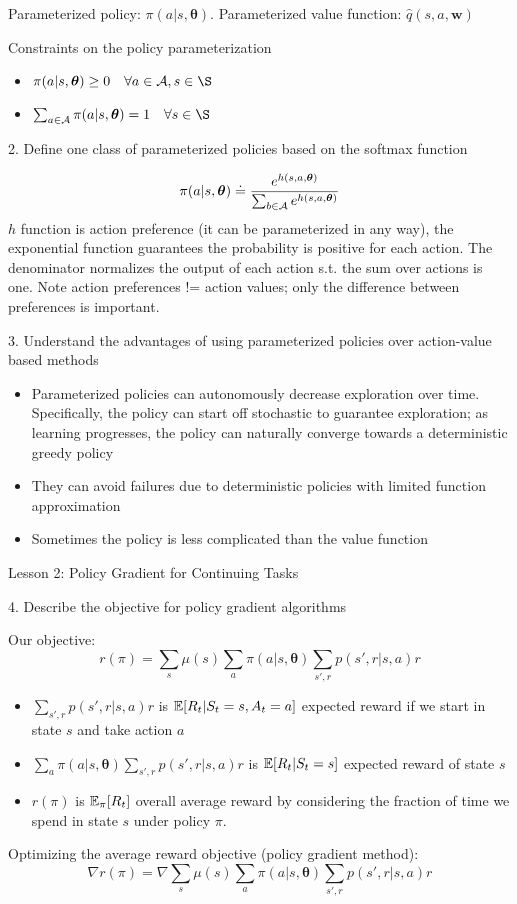 \documentclass[sutton_barto_notes.tex]{subfiles}
\begin{document}
Parameterized policy: $\pi(a|s,\bm{\theta})$. Parameterized value function: $\hat{q}(s,a,\bm{w})$

Constraints on the policy parameterization
\begin{itemize}
\item $\pi(a|s,\bm{\theta}) \geq 0 \quad \forall a \in \A, s \in \S$
\item $\sum_{a\in\A} \pi(a|s,\bm{\theta}) = 1 \quad \forall s \in \S$
\end{itemize}

2. Define one class of parameterized policies based on the softmax function 

$$\pi(a|s,\bm{\theta})\doteq \frac{e^{h(s,a,\bm{\theta})}}{\sum_{b\in\operatorname*{\mathcal{A}}}e^{h(s,a,\bm{\theta})}}$$
$h$ function is action preference (it can be parameterized in any way), the exponential function guarantees the probability is positive for each action. The denominator normalizes the output of each action s.t. the sum over actions is one.
Note action preferences != action values; only the difference between preferences is important.

3. Understand the advantages of using parameterized policies over action-value based methods 

\begin{itemize}
\item Parameterized policies can autonomously decrease exploration over time. Specifically, the policy can start off stochastic to guarantee exploration; as learning progresses, the policy can naturally converge towards a deterministic greedy policy
\item They can avoid failures due to deterministic policies with limited function approximation
\item Sometimes the policy is less complicated than the value function
\end{itemize}

Lesson 2: Policy Gradient for Continuing Tasks 

4. Describe the objective for policy gradient algorithms 

Our objective:
$$r(\pi) = \sum_s \mu(s) \sum_a \pi(a|s,\bm{\theta}) \sum_{s',r} p(s',r|s,a)r $$
\begin{itemize}
\item $\sum_{s',r} p(s',r|s,a)r$ is $\operatorname*{\mathbb{E}}[R_t | S_t=s,A_t=a]$ expected reward if we start in state $s$ and take action $a$
\item $\sum_a \pi(a|s,\bm{\theta}) \sum_{s',r} p(s',r|s,a)r$ is $\operatorname*{\mathbb{E}}[R_t | S_t=s]$ expected reward of state $s$
\item $r(\pi)$ is $\operatorname*{\mathbb{E}}_\pi [ R_t ]$ overall average reward by considering the fraction of time we spend in state $s$ under policy $\pi$.
\end{itemize}
Optimizing the average reward objective (policy gradient method):
$$\nabla r(\pi) = \nabla \sum_s \mu(s) \sum_a \pi(a|s,\bm{\theta}) \sum_{s',r} p(s',r|s,a)r $$
\end{document}
